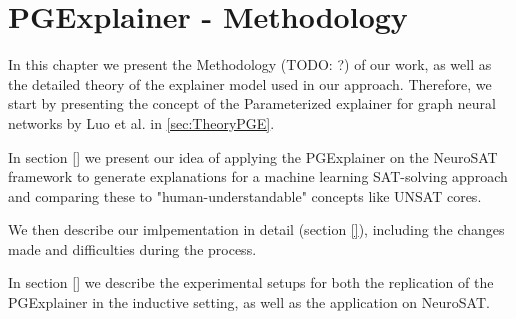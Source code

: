 \chapter{PGExplainer - Methodology}
\label{ch:PGExplainer}


In this chapter we present the Methodology (TODO: ?) of our work, as well as the detailed theory of the explainer model used in our approach. Therefore, we start by presenting the concept of the Parameterized explainer for graph neural networks by Luo et al. \cite{luo2020parameterized} in \ref{sec:TheoryPGE}.

In section \ref{} we present our idea of applying the PGExplainer on the NeuroSAT framework to generate explanations for a machine learning SAT-solving approach and comparing these to "human-understandable" concepts like UNSAT cores. 

We then describe our imlpementation in detail (section \ref{}), including the changes made and difficulties during the process.

In section \ref{} we describe the experimental setups for both the replication of the PGExplainer in the inductive setting, as well as the application on NeuroSAT.

